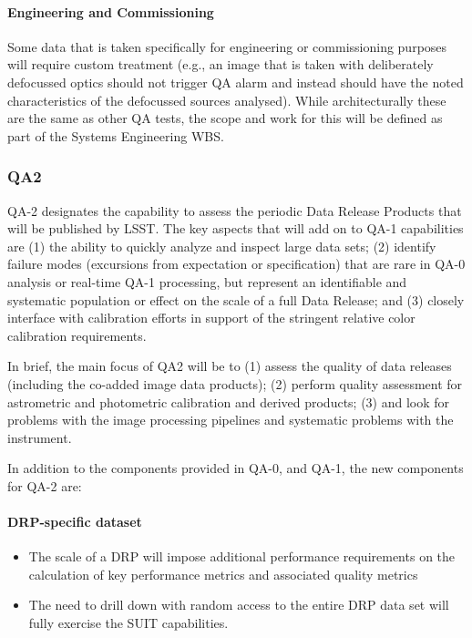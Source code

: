 \paragraph{Engineering and Commissioning}

Some data that is taken specifically for engineering or commissioning purposes will require custom treatment (e.g., an image that is taken with deliberately defocussed optics should not trigger QA alarm and instead should have the noted characteristics of the defocussed sources analysed). While architecturally these are the same as other QA tests, the scope and work for this will be defined as part of the Systems Engineering WBS.

\subsubsection{QA2}
QA-2 designates the capability to assess the periodic Data Release Products that will be published by LSST.  The key aspects that will add on to QA-1 capabilities are (1) the ability to quickly analyze and inspect large data sets; (2) identify failure modes (excursions from expectation or specification) that are rare in QA-0 analysis or real-time QA-1 processing, but represent an identifiable and systematic population or effect on the scale of a full Data Release; and (3) closely interface with calibration efforts in support of the stringent relative color calibration requirements.

In brief, the main focus of QA2 will be to (1) assess the quality of data releases (including the co-added image data products); (2) perform quality assessment for astrometric and photometric calibration and derived products; (3) and look for problems with the image processing pipelines and systematic problems with the instrument.

In addition to the components provided in QA-0, and QA-1, the new components for QA-2 are:

\paragraph{DRP-specific dataset}
\label{sec:qaDrpDataset}
\begin{itemize}
\item The scale of a DRP will impose additional performance requirements on the calculation of key performance metrics and associated quality metrics
\item The need to drill down with random access to the entire DRP data set will fully exercise the SUIT capabilities.
\end{itemize}


